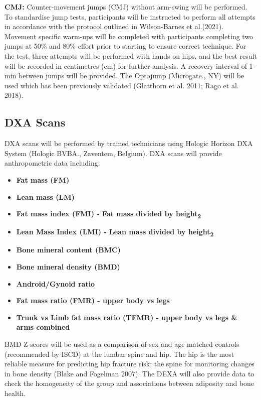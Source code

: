 \documentclass[
]{article}
\providecommand{\tightlist}{%
  \setlength{\itemsep}{0pt}\setlength{\parskip}{0pt}}
\begin{document}
\textbf{CMJ:} Counter-movement jumps (CMJ) without arm-swing will be performed. To standardise jump tests, participants will be instructed to perform all attempts in accordance with the protocol outlined in Wilson-Barnes et al.(2021). Movement specific warm-ups will be completed with participants completing two jumps at 50\% and 80\% effort prior to starting to ensure correct technique. For the test, three attempts will be performed with hands on hips, and the best result will be recorded in centimetres (cm) for further analysis. A recovery interval of 1-min between jumps will be provided. The Optojump (Microgate., NY) will be used which has been previously validated (Glatthorn et al. 2011; Rago et al. 2018).

\subsection{DXA Scans}\label{dxa-scans}

DXA scans will be performed by trained technicians using Hologic Horizon DXA System (Hologic BVBA., Zaventem, Belgium). DXA scans will provide anthropometric data including:

\begin{itemize}
\tightlist
\item
  \textbf{Fat mass (FM)}
\item
  \textbf{Lean mass (LM)}
\item
  \textbf{Fat mass index (FMI) - Fat mass divided by height\textsubscript{2}}
\item
  \textbf{Lean Mass Index (LMI) - Lean mass divided by height\textsubscript{2}}
\item
  \textbf{Bone mineral content (BMC)}
\item
  \textbf{Bone mineral density (BMD)}
\item
  \textbf{Android/Gynoid ratio}
\item
  \textbf{Fat mass ratio (FMR) - upper body vs legs}
\item
  \textbf{Trunk vs Limb fat mass ratio (TFMR) - upper body vs legs \& arms combined}
\end{itemize}

BMD Z-scores will be used as a comparison of sex and age matched controls (recommended by ISCD) at the lumbar spine and hip. The hip is the most reliable measure for predicting hip fracture risk; the spine for monitoring changes in bone density (Blake and Fogelman 2007). The DEXA will also provide data to check the homogeneity of the group and associations between adiposity and bone health.
\end{document}
